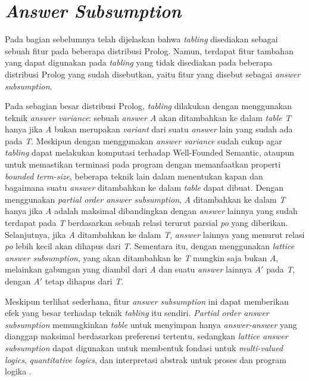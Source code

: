 \section{\textit{Answer Subsumption}}

Pada bagian sebelumnya telah dijelaskan bahwa \textit{tabling} disediakan sebagai sebuah fitur pada beberapa distribusi Prolog. Namun, terdapat fitur tambahan yang dapat digunakan pada \textit{tabling} yang tidak disediakan pada beberapa distribusi Prolog yang sudah disebutkan, yaitu fitur yang disebut sebagai \textit{answer subsumption}. 

Pada sebagian besar distribusi Prolog, \textit{tabling} dilakukan dengan menggunakan teknik \textit{answer variance}: sebuah \textit{answer A} akan ditambahkan ke dalam \textit{table T} hanya jika \textit{A} bukan merupakan \textit{variant} dari suatu \textit{answer} lain yang sudah ada pada \textit{T}. Meskipun dengan menggunakan \textit{answer variance} sudah cukup agar \textit{tabling} dapat melakukan komputasi terhadap Well-Founded Semantic, ataupun untuk memastikan terminasi pada program dengan memanfaatkan properti \textit{bounded term-size}, beberapa teknik lain dalam menentukan kapan dan bagaimana suatu \textit{answer} ditambahkan ke dalam \textit{table} dapat dibuat. Dengan menggunakan \textit{partial order answer subsumption}, \textit{A} ditambahkan ke dalam \textit{T} hanya jika \textit{A} adalah maksimal dibandingkan dengan \textit{answer} lainnya yang sudah terdapat pada \textit{T} berdasarkan sebuah relasi terurut parsial \textit{po} yang diberikan. Selanjutnya, jika \textit{A} ditambahkan ke dalam \textit{T}, \textit{answer} lainnya yang menurut relasi \textit{po} lebih kecil akan dihapus dari \textit{T}. Sementara itu, dengan menggunakan \textit{lattice answer subsumption}, yang akan ditambahkan ke \textit{T} mungkin saja bukan \textit{A}, melainkan gabungan yang diambil dari \textit{A} dan suatu \textit{answer} lainnya \textit{A$'$} pada \textit{T}, dengan \textit{A$'$} tetap dihapus dari \textit{T}. 

Meskipun terlihat sederhana, fitur \textit{answer subsumption} ini dapat memberikan efek yang besar terhadap teknik \textit{tabling} itu sendiri. \textit{Partial order answer subsumption} memungkinkan \textit{table} untuk menyimpan hanya \textit{answer-answer} yang dianggap maksimal berdasarkan preferensi tertentu, sedangkan \textit{lattice answer subsumption} dapat digunakan untuk membentuk fondasi untuk \textit{multi-valued logics}, \textit{quantitative logics}, dan interpretasi abstrak untuk proses dan program logika \citep{swift2010tabling}.
